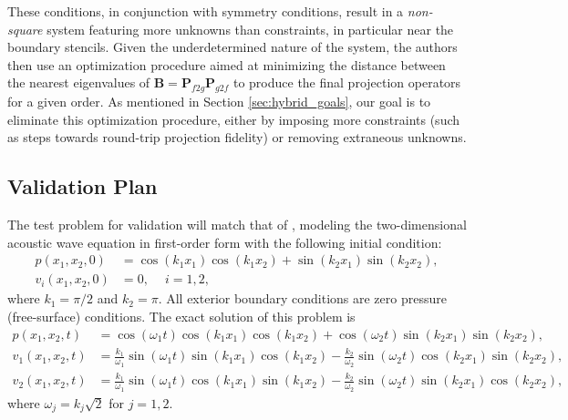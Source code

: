 These conditions, in conjunction with symmetry conditions, result in a \emph{non-square}
system featuring more unknowns than constraints, in particular near the boundary stencils.
Given the underdetermined nature of the system, the authors then use an optimization
procedure aimed at minimizing the distance between the nearest eigenvalues of $\pmb{B} =
\pmb{P}_{f2g}\pmb{P}_{g2f}$ to produce the final projection operators for a given order.
As mentioned in Section \ref{sec:hybrid_goals}, our goal is to eliminate this optimization
procedure, either by imposing more constraints (such as steps towards round-trip projection
fidelity) or removing extraneous unknowns.

\subsection{Validation Plan}

The test problem for validation will match that of \cite{kozdon2016stable},
modeling the two-dimensional acoustic wave equation in first-order form with
the following initial condition:
\begin{align}
  p(x_{1},x_{2},0) &=
  \cos\left(k_{1} x_{1}\right)\cos\left(k_{1} x_{2}\right)
  +
  \sin\left(k_{2} x_{1}\right)\sin\left(k_{2} x_{2}\right),\\
  v_{i}(x_{1},x_{2},0) &= 0,~ \quad i=1,2,
\end{align}
where $k_{1} = \pi/2$ and $k_{2} = \pi$. All exterior boundary conditions are
zero pressure (free-surface) conditions. The exact solution of this problem is
\begin{align}
  p(x_{1},x_{2},t) &=
  \cos\left(\omega_{1} t\right)
  \cos\left(k_{1} x_{1}\right)\cos\left(k_{1} x_{2}\right)
  +
  \cos\left(\omega_{2} t\right)
  \sin\left(k_{2} x_{1}\right)\sin\left(k_{2} x_{2}\right),\\
  v_{1}(x_{1},x_{2},t) &=
  \frac{k_{1}}{\omega_{1}} \sin\left(\omega_{1} t\right)
  \sin\left(k_{1} x_{1}\right)\cos\left(k_{1} x_{2}\right)
  -
  \frac{k_{2}}{\omega_{2}} \sin\left(\omega_{2} t\right)
  \cos\left(k_{2} x_{1}\right)\sin\left(k_{2} x_{2}\right),\\
  v_{2}(x_{1},x_{2},t) &=
  \frac{k_{1}}{\omega_{1}} \sin\left(\omega_{1} t\right)
  \cos\left(k_{1} x_{1}\right)\sin\left(k_{1} x_{2}\right)
  -
  \frac{k_{2}}{\omega_{2}} \sin\left(\omega_{2} t\right)
  \sin\left(k_{2} x_{1}\right)\cos\left(k_{2} x_{2}\right),
\end{align}
where $\omega_{j} = k_{j}\sqrt{2}$ for $j=1,2$. 

